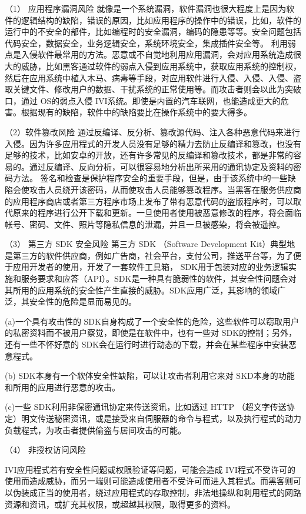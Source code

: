 （1） 应用程序漏洞风险 
就像是一个系统漏洞，软件漏洞也很大程度上是因为软件的逻辑结构的缺陷，错误的原因，比如应用程序的操作中的错误，比如，软件的运行中的不安全的部件，比如编程时的安全漏洞，编码的隐患等等。安全问题包括代码安全，数据安全，业务逻辑安全，系统环境安全，集成插件安全等。
利用弱点是入侵软件最常用的方法。恶意或不自觉地利用应用漏洞，会对应用系统造成很大的威胁，比如黑客通过软件的弱点入侵到应用系统中，获取应用系统的控制权，然后在应用系统中植入木马、病毒等手段，对应用软件进行入侵、入侵、入侵、盗取关键文件、修改用户的数据、干扰系统的正常使用等。而攻击者则会以此为突破口，通过 OS的弱点入侵 IVI系统。即使是内置的汽车联网，也能造成更大的危害。根据现有的缺陷，软件中的缺陷要比在操作系统中的要大得多。

（2）软件篡改风险 
通过反编译、反分析、篡改源代码、注入各种恶意代码来进行入侵。因为许多应用程式的开发人员没有足够的精力去防止反编译和篡改，也没有足够的技术，比如安卓的开放，还有许多常见的反编译和篡改技术，都是非常的容易的。通过反编译、反向分析，可以很容易地分析出所采用的通讯协定及资料的密码方法。
签名和检查是保护程序安全的重要手段，但是，由于该系统中的一些缺陷会使攻击人员绕开该密码，从而使攻击人员能够篡改程序。当黑客在服务供应商的应用程序商店或者第三方程序市场上发布了带有恶意代码的盗版程序时，可以取代原来的程序进行公开下载和更新。一旦使用者使用被恶意修改的程序，将会面临帐号、密码、文件、照片等隐私信息的泄漏，并且一旦被感染，将会被遥控。 

（3） 第三方 SDK 安全风险
第三方 SDK （Software Development Kit）典型地是第三方的软件供应商，例如广告商，社会平台，支付公司，推送平台等，为了便于应用开发者的使用，开发了一套软件工具箱， SDK用于包装对应的业务逻辑实施和服务要求和应答（API）。SDK是一种具有脆弱性的软件，其安全性问题会对其所用的应用系统的安全性产生直接的威胁。SDK应用广泛，其影响的领域广泛，其安全性的危险是显而易见的。 

(a)一个具有攻击性的 SDK自身构成了一个安全性的危险，这些软件可以窃取用户的私密资料而不被用户察觉，即使是在软件中，也有一些对 SDK的控制；另外，还有一些不怀好意的 SDK会在运行时进行动态的下载，并会在某些程序中安装恶意程式。

(b) SDK本身有一个软体安全性缺陷，可以让攻击者利用它来对 SKD本身的功能和所用的应用进行恶意的攻击。

(c)一些 SDK利用非保密通讯协定来传送资讯，比如透过 HTTP （超文字传送协定）明文传送秘密资讯，或是接受来自伺服器的命令与程式，以及执行程式的动力负载程式，为攻击者提供偷盗与居间攻击的可能。

（4） 非授权访问风险 

IVI应用程式若有安全性问题或权限验证等问题，可能会造成 IVI程式不受许可的使用而造成威胁，而另一端则可能造成使用者不受许可而进入其程式。而黑客则可以伪装成正当的使用者，绕过应用程式的存取控制，非法地操纵和利用程式的网路资源和资讯，或扩充其权限，或超越其权限，取得更多的资料。

